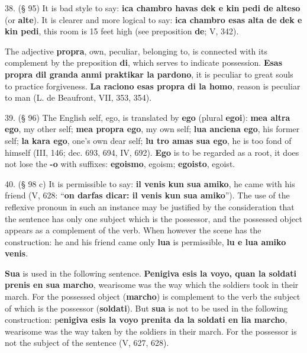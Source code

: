 38. (§ 95) It is bad style to say: \textbf{ica chambro havas dek e kin pedi de alteso} (or \textbf{alte}). It is clearer and more logical to say: \textbf{ica chambro esas alta de dek e kin pedi}, this room is 15 feet high (see preposition \textbf{de}; V, 342). %

The adjective \textbf{propra}, own, peculiar, belonging to, is connected with its complement by the preposition \textbf{di}, which serves to indicate possession. \textbf{Esas propra dil granda anmi praktikar la pardono}, it is peculiar to great souls to practice forgiveness. \textbf{La raciono esas propra di la homo}, reason is peculiar to man (L. de Beaufront, VII, 353, 354).

39. (§ 96) The English self, ego, is translated by \textbf{ego} (plural \textbf{egoi}): \textbf{mea altra ego}, my other self; \textbf{mea propra ego}, my own self; \textbf{lua anciena ego}, his former self; \textbf{la kara ego}, one's own dear self; \textbf{lu tro amas sua ego}, he is too fond of himself (III, 146; dec. 693, 694, IV, 692). \textbf{Ego} is to be regarded as a root, it does not lose the \textbf{-o} with suffixes: \textbf{egoismo}, egoism; \textbf{egoisto}, egoist. %

40. (§ 98 c) It is permissible to say: \textbf{il venis kun sua amiko}, he came with his friend (V, 628: ``\textbf{on darfas dicar: il venis kun sua amiko}''). The use of the reflexive pronoun in such an instance may be justified by the consideration that the sentence has only one subject which is the possessor, and the possessed object appears as a complement of the verb. When however the scene has the construction: he and his friend came only \textbf{lua} is permissible, \textbf{lu e lua amiko venis}. %

\textbf{Sua} is used in the following sentence. \textbf{Penigiva esis la voyo, quan la soldati prenis en sua marcho}, wearisome was the way which the soldiers took in their march. For the possessed object (\textbf{marcho}) is complement to the verb the subject of which is the possessor (\textbf{soldati}). But \textbf{sua} is not to be used in the following construction: p\textbf{enigiva esis la voyo prenita da la soldati en lia marcho}, wearisome was the way taken by the soldiers in their march. For the possessor is not the subject of the sentence (V, 627, 628).

